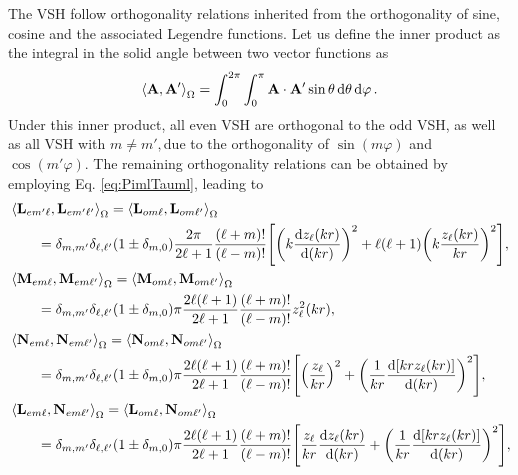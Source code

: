The VSH follow orthogonality relations inherited from the orthogonality of sine, cosine and the associated Legendre functions. Let us define the inner product as the integral in the solid angle between two vector functions as
%
%
%
\begin{align}
\ev{\vb{A},\vb{A}'}_\Omega = \int_0^{2\pi}\int_0^{\pi} \vb{A}\cdot\vb{A}'\sin\theta\dd{\theta}\dd{\varphi}.
\label{eq:inner}
\end{align}
%
Under this inner product, all even VSH are orthogonal to the odd VSH, as well as all VSH  with $m\neq m', $due to the orthogonality of $\sin(m\varphi)$ and $\cos(m'\varphi)$. The remaining orthogonality relations  can be obtained by employing Eq. \eqref{eq:PimlTauml}, leading to
%
\begin{align}
&\ev{\vb{L}_{em'\ell},\vb{L}_{em'\ell'}}_\Omega = \ev{\vb{L}_{om\ell},\vb{L}_{om\ell'}}_\Omega \notag\\
	 &\hspace*{2em} =
 	\delta_{m,m'}\delta_{\ell,\ell'} (1\pm\delta_{m,0})
 	\frac{2\pi}{2\ell+1}\frac{(\ell+m)!}{(\ell-m)!}
 	\qty[\qty(k\dv{z_\ell(kr)}{(kr)})^2 + \ell(\ell+1)\qty(k\frac{z_\ell(kr)}{kr})^2],
    \label{eq:LL}\\
%
&\ev{\vb{M}_{em\ell},\vb{M}_{em\ell'}}_\Omega = \ev{\vb{M}_{om\ell},\vb{M}_{om\ell'}}_\Omega \notag\\
		 &\hspace*{2em} =
	\delta_{m,m'}\delta_{\ell,\ell'} (1\pm\delta_{m,0})
	\pi \frac{2  \ell(\ell+1)}{2\ell+1}\frac{(\ell+m)!}{(\ell-m)!}
	z_{\ell}^2(kr),\\
%
&\ev{\vb{N}_{em\ell},\vb{N}_{em\ell'}}_\Omega = \ev{\vb{N}_{om\ell},\vb{N}_{om\ell'}}_\Omega  \notag\\
	 &\hspace*{2em} =
	 \delta_{m,m'}\delta_{\ell,\ell'} (1\pm\delta_{m,0})
	\pi \frac{2  \ell(\ell+1)}{2\ell+1}\frac{(\ell+m)!}{(\ell-m)!}
	\qty[\qty(\frac{ z_{\ell}}{kr})^2 + \qty(\frac{1}{kr}\dv{[kr z_\ell(kr)]}{(kr)})^2], \\
&\ev{\vb{L}_{em\ell},\vb{N}_{em\ell'}}_\Omega = \ev{\vb{L}_{om\ell},\vb{N}_{om\ell'}}_\Omega \notag\\
	 &\hspace*{2em} =
	 \delta_{m,m'}\delta_{\ell,\ell'} (1\pm\delta_{m,0})
	\pi \frac{2  \ell(\ell+1)}{2\ell+1}\frac{(\ell+m)!}{(\ell-m)!}
	\qty[\frac{ z_{\ell}}{kr}\dv{z_\ell(kr)}{(kr)} + \qty(\frac{1}{kr}\dv{[kr z_\ell(kr)]}{(kr)})^2],
    \label{eq:LM}
\end{align}
